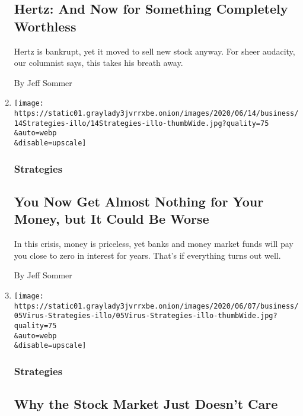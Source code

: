 \begin{enumerate}
{  \subsection{Hertz: And Now for Something Completely
  Worthless}\label{hertz-and-now-for-something-completely-worthless}}

  Hertz is bankrupt, yet it moved to sell new stock anyway. For sheer
  audacity, our columnist says, this takes his breath away.

  By Jeff Sommer
\item
  \href{/2020/06/12/business/emergency-fund-money-market.html}{}

  \texttt{[image: https://static01.graylady3jvrrxbe.onion/images/2020/06/14/business/14Strategies-illo/14Strategies-illo-thumbWide.jpg?quality=75\\\&auto=webp\\\&disable=upscale]}

  \hypertarget{strategies-6}{%
  \subsubsection{Strategies}\label{strategies-6}}

  \hypertarget{you-now-get-almost-nothing-for-your-money-but-it-could-be-worse}{%
  \subsection{You Now Get Almost Nothing for Your Money, but It Could Be
  Worse}\label{you-now-get-almost-nothing-for-your-money-but-it-could-be-worse}}

  In this crisis, money is priceless, yet banks and money market funds
  will pay you close to zero in interest for years. That's if everything
  turns out well.

  By Jeff Sommer
\item
  \href{/2020/06/05/business/why-the-stock-market-just-doesnt-care.html}{}

  \texttt{[image: https://static01.graylady3jvrrxbe.onion/images/2020/06/07/business/05Virus-Strategies-illo/05Virus-Strategies-illo-thumbWide.jpg?quality=75\\\&auto=webp\\\&disable=upscale]}

  \hypertarget{strategies-7}{%
  \subsubsection{Strategies}\label{strategies-7}}

  \hypertarget{why-the-stock-market-just-doesnt-care}{%
  \subsection{Why the Stock Market Just Doesn't
  Care}\label{why-the-stock-market-just-doesnt-care}}


\end{enumerate}
